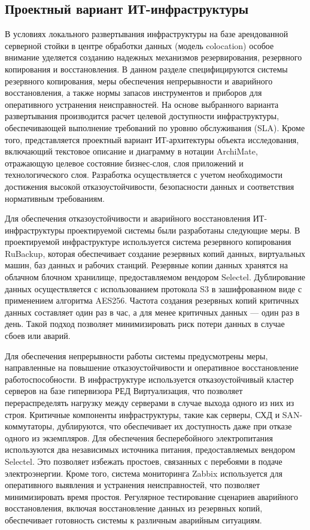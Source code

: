 \documentclass[14pt, a4paper]{extarticle}
\begin{document}
\subsection{Проектный вариант ИТ-инфраструктуры}

В условиях локального развертывания инфраструктуры на базе арендованной
серверной стойки в центре обработки данных (модель colocation) особое
внимание уделяется созданию надежных механизмов резервирования,
резервного копирования и восстановления. В данном разделе специфицируются
системы резервного копирования, меры обеспечения непрерывности и аварийного
восстановления, а также нормы запасов инструментов и приборов для оперативного
устранения неисправностей. На основе выбранного варианта развертывания
производится расчет целевой доступности инфраструктуры, обеспечивающей
выполнение требований по уровню обслуживания (SLA). Кроме того, представляется
проектный вариант ИТ-архитектуры объекта исследования, включающий текстовое
описание и диаграмму в нотации ArchiMate, отражающую целевое состояние
бизнес-слоя, слоя приложений и технологического слоя. Разработка осуществляется
с учетом необходимости достижения высокой отказоустойчивости, безопасности данных
и соответствия нормативным требованиям.


Для обеспечения отказоустойчивости и аварийного восстановления ИТ-инфраструктуры проектируемой системы были разработаны следующие меры. В проектируемой инфраструктуре используется система резервного копирования RuBackup, которая обеспечивает создание резервных копий данных, виртуальных машин, баз данных и рабочих станций. Резервные копии данных хранятся на облачном блочном хранилище, предоставляемом вендором Selectel. Дублирование данных осуществляется с использованием протокола S3 в зашифрованном виде с применением алгоритма AES256. Частота создания резервных копий критичных данных составляет один раз в час, а для менее критичных данных — один раз в день. Такой подход позволяет минимизировать риск потери данных в случае сбоев или аварий.

Для обеспечения непрерывности работы системы предусмотрены меры, направленные на повышение отказоустойчивости и оперативное восстановление работоспособности. В инфраструктуре используется отказоустойчивый кластер серверов на базе гипервизора РЕД Виртуализация, что позволяет перераспределять нагрузку между серверами в случае выхода одного из них из строя. Критичные компоненты инфраструктуры, такие как серверы, СХД и SAN-коммутаторы, дублируются, что обеспечивает их доступность даже при отказе одного из экземпляров. Для обеспечения бесперебойного электропитания используются два независимых источника питания, предоставляемых вендором Selectel. Это позволяет избежать простоев, связанных с перебоями в подаче электроэнергии. Кроме того, система мониторинга Zabbix используется для оперативного выявления и устранения неисправностей, что позволяет минимизировать время простоя. Регулярное тестирование сценариев аварийного восстановления, включая восстановление данных из резервных копий, обеспечивает готовность системы к различным аварийным ситуациям.
\end{document}
